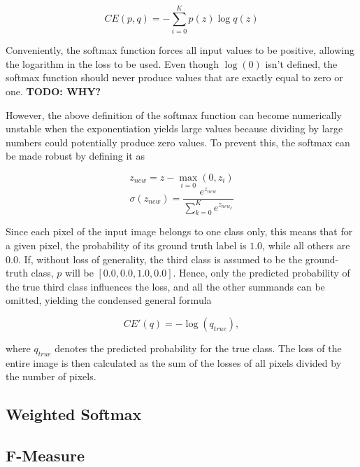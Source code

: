 \[CE(p, q) = -\sum \limits_{i = 0}^{K} p(z) \log q(z)\]

\noindent Conveniently, the softmax function forces all input values to be positive, allowing the logarithm in the loss to be used. Even though $\log (0)$ isn't defined, the softmax function should never produce values that are exactly equal to zero or one. \textbf{TODO: WHY?} 

However, the above definition of the softmax function can become numerically unstable when the exponentiation yields large values because dividing by large numbers could potentially produce zero values. To prevent this, the softmax can be made robust by defining it as

\[z_{new} = z - \max \limits_{i = 0}(0, z_i)\]
\[\sigma(z_{new}) = \frac{e^{z_{new}}}{\sum \limits_{k=0}^{K} e^{z_{new_{k}}}}\]

\noindent Since each pixel of the input image belongs to one class only, this means that for a given pixel, the probability of its ground truth label is $1.0$, while all others are $0.0$. If, without loss of generality, the third class is assumed to be the ground-truth class, $p$ will be $[0.0, 0.0, 1.0, 0.0]$.  Hence, only the predicted probability of the true third class influences the loss, and all the other summands can be omitted, yielding the condensed general formula

\[CE'(q) = - \log(q_{true}),\]

\noindent where $q_{true}$ denotes the predicted probability for the true class. The loss of the entire image is then calculated as the sum of the losses of all pixels divided by the number of pixels.



		\subsection{Weighted Softmax}

		\subsection{F-Measure}
